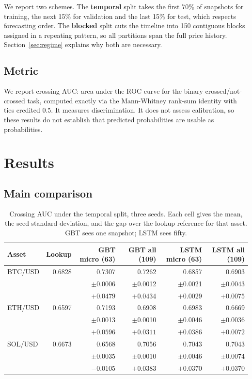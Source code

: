 \documentclass[11pt]{article}
\begin{document}
We report two schemes. The \textbf{temporal} split takes the first 70\% of
snapshots for training, the next 15\% for validation and the last 15\% for
test, which respects forecasting order. The \textbf{blocked} split cuts the
timeline into 150 contiguous blocks assigned in a repeating pattern, so all
partitions span the full price history. Section~\ref{sec:regime} explains why
both are necessary.

\subsection{Metric}

We report crossing AUC: area under the ROC curve for the binary
crossed/not-crossed task, computed exactly via the Mann-Whitney rank-sum identity with ties
credited 0.5. It measures discrimination. It does not assess calibration, so
these results do not establish that predicted probabilities are usable as
probabilities.

\section{Results}
\label{sec:results}

\subsection{Main comparison}

\begin{table}[ht]
\centering
\caption{Crossing AUC under the temporal split, three seeds. Each cell gives the
mean, the seed standard deviation, and the gap over the lookup reference for
that asset. GBT sees one snapshot; LSTM sees fifty.}
\label{tab:main}
\small
\begin{tabular}{lrrrrr}
\toprule
Asset & Lookup & GBT micro (63) & GBT all (109) & LSTM micro (63) & LSTM all (109) \\
\midrule
BTC/USD & 0.6828 & 0.7307 & 0.7262 & 0.6857 & 0.6903 \\
        &        & \tiny$\pm$0.0006 & \tiny$\pm$0.0012 & \tiny$\pm$0.0021 & \tiny$\pm$0.0043 \\
        &        & $+0.0479$ & $+0.0434$ & $+0.0029$ & $+0.0075$ \\
\addlinespace
ETH/USD & 0.6597 & 0.7193 & 0.6908 & 0.6983 & 0.6669 \\
        &        & \tiny$\pm$0.0013 & \tiny$\pm$0.0010 & \tiny$\pm$0.0046 & \tiny$\pm$0.0036 \\
        &        & $+0.0596$ & $+0.0311$ & $+0.0386$ & $+0.0072$ \\
\addlinespace
SOL/USD & 0.6673 & 0.6568 & 0.7056 & 0.7043 & 0.7043 \\
        &        & \tiny$\pm$0.0035 & \tiny$\pm$0.0010 & \tiny$\pm$0.0046 & \tiny$\pm$0.0074 \\
        &        & $-0.0105$ & $+0.0383$ & $+0.0370$ & $+0.0370$ \\
\bottomrule
\end{tabular}
\end{table}
\end{document}
